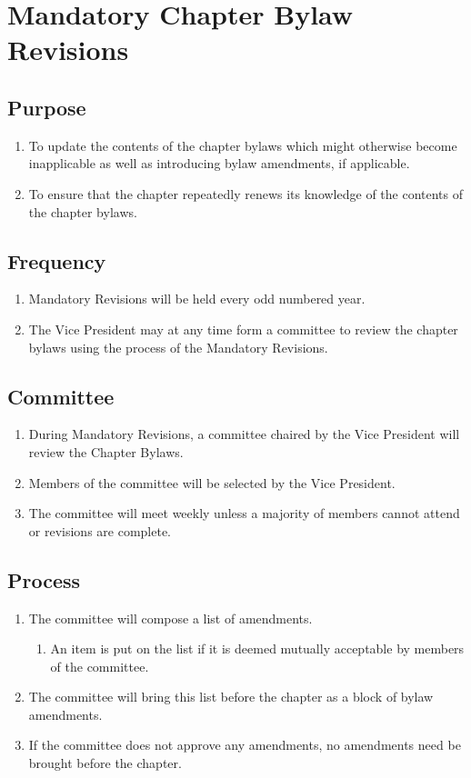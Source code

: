 \chapter{Mandatory Chapter Bylaw Revisions}
\section{Purpose}
	\begin{enumerate}
		\item To update the contents of the chapter bylaws which might otherwise become inapplicable as well as introducing bylaw amendments, if applicable.
		\item To ensure that the chapter repeatedly renews its knowledge of the contents of the chapter bylaws.
	\end{enumerate}


\section{Frequency}
	\begin{enumerate}
		\item Mandatory Revisions will be held every odd numbered year.
		\item The Vice President may at any time form a committee to review the chapter bylaws using the process of the Mandatory Revisions.
	\end{enumerate}

\section{Committee} 
	\label{bylaw-revisions}
	\begin{enumerate}
		\item During Mandatory Revisions, a committee chaired by the Vice President will review the Chapter Bylaws.
		\item Members of the committee will be selected by the Vice President.
		\item The committee will meet weekly unless a majority of members cannot attend or revisions are complete.
	\end{enumerate}

\section{Process}
	\begin{enumerate}
		\item The committee will compose a list of amendments.
		\begin{enumerate}
			\item An item is put on the list if it is deemed mutually acceptable by members of the committee.
		\end{enumerate}
		\item The committee will bring this list before the chapter as a block of bylaw amendments.
		\item If the committee does not approve any amendments, no amendments need be brought before the chapter.
	\end{enumerate}
